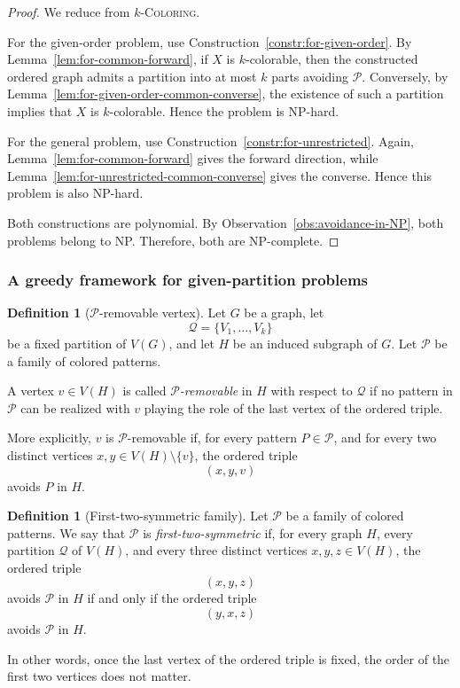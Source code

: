 \documentclass[12pt]{article}
\theoremstyle{plain}
\theoremstyle{definition}
\newtheorem{definition}[theorem]{Definition}
\theoremstyle{remark}
\theoremstyle{definition}
\begin{document}
\begin{proof}
We reduce from \(k\)-\textsc{Coloring}.

For the given-order problem, use
Construction~\ref{constr:for-given-order}.
By Lemma~\ref{lem:for-common-forward}, if \(X\) is \(k\)-colorable,
then the constructed ordered graph admits a partition into at most
\(k\) parts avoiding \(\mathcal P\).
Conversely, by
Lemma~\ref{lem:for-given-order-common-converse}, the existence of such
a partition implies that \(X\) is \(k\)-colorable.
Hence the problem is NP-hard.

For the general problem, use
Construction~\ref{constr:for-unrestricted}.
Again, Lemma~\ref{lem:for-common-forward} gives the forward direction,
while Lemma~\ref{lem:for-unrestricted-common-converse} gives the
converse. Hence this problem is also NP-hard.

Both constructions are polynomial. By
Observation~\ref{obs:avoidance-in-NP}, both problems belong to NP.
Therefore, both are NP-complete.
\end{proof}


\subsubsection{A greedy framework for given-partition problems}
\label{subsubsec:for-greedy-given-partition}



\begin{definition}[\(\mathcal P\)-removable vertex]
Let \(G\) be a graph, let
\[
\mathcal Q=\{V_1,\dots,V_k\}
\]
be a fixed partition of \(V(G)\), and let \(H\) be an induced subgraph of \(G\). Let \(\mathcal P\) be a family of colored patterns.

A vertex \(v\in V(H)\) is called \emph{\(\mathcal P\)-removable} in \(H\) with respect to \(\mathcal Q\) if no pattern
in \(\mathcal P\) can be realized with \(v\) playing the role of the last vertex of the ordered triple.

More explicitly, \(v\) is \(\mathcal P\)-removable if, for every pattern \(P\in\mathcal P\), and for every two distinct
vertices \(x,y\in V(H)\setminus\{v\}\), the ordered triple
\[
(x,y,v)
\]
avoids \(P\) in \(H\).
\end{definition}






\begin{definition}[First-two-symmetric family]
Let \(\mathcal P\) be a family of colored patterns. We say that \(\mathcal P\) is
\emph{first-two-symmetric} if, for every graph \(H\), every partition \(\mathcal Q\) of \(V(H)\),
and every three distinct vertices \(x,y,z\in V(H)\), the ordered triple
\[
(x,y,z)
\]
avoids \(\mathcal P\) in \(H\) if and only if the ordered triple
\[
(y,x,z)
\]
avoids \(\mathcal P\) in \(H\).

In other words, once the last vertex of the ordered triple is fixed, the order of the first two vertices does not matter.
\end{definition}
\end{document}
